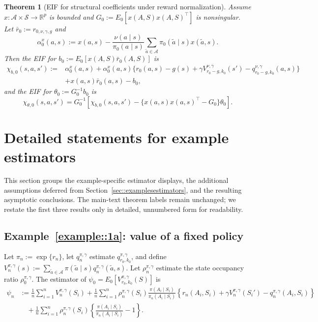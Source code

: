 \documentclass[11pt]{article}
\theoremstyle{plain}
\newtheorem{theorem}{Theorem}
\begin{document}
\begin{theorem}[EIF for structural coefficients under reward normalization]
\label{theorem::EIFcoefnorm}
Assume \(x:\mathcal A \times \mathcal S \to \mathbb R^p\) is bounded and
\(G_0 := E_0[x(A,S)x(A,S)^\top]\) is nonsingular. Let
\(\bar r_0 := r_{0,\nu,\gamma,g}\) and
\[
\alpha_0^x(a,s)
:=
x(a,s) - \frac{\nu(a\mid s)}{\pi_0(a\mid s)}
\sum_{\tilde a \in \mathcal A}\pi_0(\tilde a\mid s)x(\tilde a,s).
\]
Then the EIF for \(b_0 := E_0[x(A,S)\bar r_0(A,S)]\) is
\[
\begin{aligned}
\chi_{b,0}(s,a,s')
:={}& \alpha_0^x(a,s)
+ \alpha_0^x(a,s)\bigl\{r_0(a,s)-g(s)
+\gamma V_{r_0-g,k_0}^{\nu,\gamma}(s')
-q_{r_0-g,k_0}^{\nu,\gamma}(a,s)\bigr\} \\
&+ x(a,s)\bar r_0(a,s)-b_0,
\end{aligned}
\]
and the EIF for \(\theta_0 := G_0^{-1}b_0\) is
\[
\chi_{\theta,0}(s,a,s')
=
G_0^{-1}\!\left[
\chi_{b,0}(s,a,s')
- \{x(a,s)x(a,s)^\top - G_0\}\theta_0
\right].
\]
\end{theorem}

 


\section{Detailed statements for example estimators}
\label{app:estimator:details}
\label{app::examplesestimators}

This section groups the example-specific estimator displays, the additional
assumptions deferred from Section~\ref{sec::examplesestimators}, and the
resulting asymptotic conclusions. The main-text theorem labels remain
unchanged; we restate the first three results only in detailed, unnumbered
form for readability.

\subsection{Example~\ref{example::1a}: value of a fixed policy}

Let \(\pi_n:=\exp\{r_n\}\), let \(q_n^{\pi,\gamma}\) estimate
\(q_{r_0,k_0}^{\pi,\gamma}\), and define
\(V_n^{\pi,\gamma}(s):=\sum_{\tilde a\in\mathcal A}\pi(\tilde a\mid s)
q_n^{\pi,\gamma}(\tilde a,s)\). Let \(\rho_n^{\pi,\gamma}\) estimate the state
occupancy ratio \(\rho_0^{\pi,\gamma}\). The estimator of
\(\psi_0=E_0[V_{r_0,k_0}^{\pi,\gamma}(S)]\) is
\begin{align*}
\psi_n
&:= \frac{1}{n}\sum_{i=1}^n V_n^{\pi,\gamma}(S_i)
  + \frac{1}{n}\sum_{i=1}^n
  \rho_n^{\pi,\gamma}(S_i)
  \frac{\pi(A_i\mid S_i)}{\pi_n(A_i\mid S_i)}
  \left\{
  r_n(A_i,S_i)+\gamma V_n^{\pi,\gamma}(S_i')
  -q_n^{\pi,\gamma}(A_i,S_i)
  \right\} \\
&\quad
  + \frac{1}{n}\sum_{i=1}^n
  \rho_n^{\pi,\gamma}(S_i)
  \left\{
  \frac{\pi(A_i\mid S_i)}{\pi_n(A_i\mid S_i)}-1
  \right\}.
\end{align*}
\end{document}
